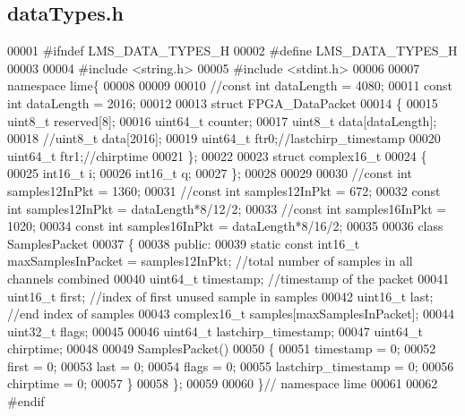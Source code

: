 \subsection{data\+Types.\+h}
\label{dataTypes_8h_source}

\begin{DoxyCode}
00001 \textcolor{preprocessor}{#ifndef LMS\_DATA\_TYPES\_H}
00002 \textcolor{preprocessor}{#define LMS\_DATA\_TYPES\_H}
00003 
00004 \textcolor{preprocessor}{#include <string.h>}
00005 \textcolor{preprocessor}{#include <stdint.h>}
00006 
00007 \textcolor{keyword}{namespace }lime\{
00008 
00009 
00010   \textcolor{comment}{//const int dataLength = 4080;}
00011   \textcolor{keyword}{const} \textcolor{keywordtype}{int} dataLength = 2016;
00012 
00013 \textcolor{keyword}{struct }FPGA_DataPacket
00014 \{
00015     uint8\_t reserved[8];
00016     uint64\_t counter;
00017     uint8\_t data[dataLength];
00018     \textcolor{comment}{//uint8\_t data[2016];}
00019     uint64\_t ftr0;\textcolor{comment}{//lastchirp\_timestamp}
00020     uint64\_t ftr1;\textcolor{comment}{//chirptime}
00021 \};
00022 
00023 \textcolor{keyword}{struct }complex16_t
00024 \{
00025     int16\_t i;
00026     int16\_t q;
00027 \};
00028 
00029 
00030 \textcolor{comment}{//const int samples12InPkt = 1360;}
00031 \textcolor{comment}{//const int samples12InPkt = 672;}
00032 \textcolor{keyword}{const} \textcolor{keywordtype}{int} samples12InPkt = dataLength*8/12/2;
00033 \textcolor{comment}{//const int samples16InPkt = 1020;}
00034 \textcolor{keyword}{const} \textcolor{keywordtype}{int} samples16InPkt = dataLength*8/16/2;
00035 
00036 \textcolor{keyword}{class }SamplesPacket
00037 \{
00038 \textcolor{keyword}{public}:
00039     \textcolor{keyword}{static} \textcolor{keyword}{const} int16\_t maxSamplesInPacket = samples12InPkt; \textcolor{comment}{//total number of samples in all channels
       combined}
00040     uint64\_t timestamp; \textcolor{comment}{//timestamp of the packet}
00041     uint16\_t first; \textcolor{comment}{//index of first unused sample in samples}
00042     uint16\_t last; \textcolor{comment}{//end index of samples}
00043     complex16_t samples[maxSamplesInPacket];
00044     uint32\_t flags;
00045 
00046     uint64\_t lastchirp_timestamp;
00047     uint64\_t chirptime;
00048 
00049     SamplesPacket()
00050     \{
00051         timestamp = 0;
00052         first = 0;
00053         last = 0;
00054         flags = 0;
00055         lastchirp\_timestamp = 0;
00056         chirptime = 0;
00057     \}
00058 \};
00059 
00060 \}\textcolor{comment}{// namespace lime}
00061 
00062 \textcolor{preprocessor}{#endif}
\end{DoxyCode}
